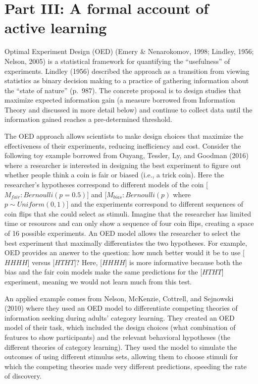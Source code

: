 \documentclass[english,floatsintext,man]{apa6}
\theoremstyle{definition}
\theoremstyle{definition}
\theoremstyle{definition}
\theoremstyle{remark}
\begin{document}
\hypertarget{p3}{\section{Part III: A formal account of active
learning}\label{p3}}

Optimal Experiment Design (OED) (Emery \& Nenarokomov, 1998; Lindley,
1956; Nelson, 2005) is a statistical framework for quantifying the
\enquote{usefulness} of experiments. Lindley (1956) described the
approach as a transition from viewing statistics as binary decision
making to a practice of gathering information about the \enquote{state
of nature} (p.~987). The concrete proposal is to design studies that
maximize expected information gain (a measure borrowed from Information
Theory and discussed in more detail below) and continue to collect data
until the information gained reaches a pre-determined threshold.

The OED approach allows scientists to make design choices that maximize
the effectiveness of their experiments, reducing inefficiency and cost.
Consider the following toy example borrowed from Ouyang, Tessler, Ly,
and Goodman (2016) where a researcher is interested in designing the
best experiment to figure out whether people think a coin is fair or
biased (i.e., a trick coin). Here the researcher's hypotheses correspond
to different models of the coin {[}\(M_{fair}: Bernoulli(p = 0.5)\){]}
and {[}\(M_{bias}: Bernoulli(p)\) where \(p \sim Uniform(0,1)\){]} and
the experiments correspond to different sequences of coin flips that she
could select as stimuli. Imagine that the researcher has limited time or
resources and can only show a sequence of four coin flips, creating a
space of 16 possible experiments. An OED model allows the researcher to
select the best experiment that maximally differentiates the two
hypotheses. For example, OED provides an answer to the question: how
much better would it be to use {[}\(HHHH\){]} versus {[}\(HTHT\){]}?
Here, {[}\(HHHH\){]} is more informative because both the bias and the
fair coin models make the same predictions for the {[}\(HTHT\){]}
experiment, meaning we would not learn much from this test.

An applied example comes from Nelson, McKenzie, Cottrell, and Sejnowski
(2010) where they used an OED model to differentiate competing theories
of information seeking during adults' category learning. They created an
OED model of their task, which included the design choices (what
combination of features to show participants) and the relevant
behavioral hypotheses (the different theories of category learning).
They used the model to simulate the outcomes of using different stimulus
sets, allowing them to choose stimuli for which the competing theories
made very different predictions, speeding the rate of discovery.
\end{document}
